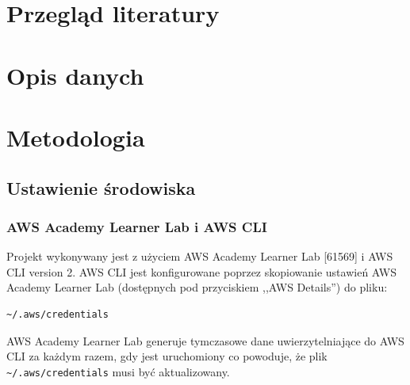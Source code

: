\documentclass[12pt, a4paper]{article}
\begin{document}







\section{Przegląd literatury}

\section{Opis danych}


\section{Metodologia}

\subsection{Ustawienie środowiska}
\subsubsection{AWS Academy Learner Lab i AWS CLI}
Projekt wykonywany jest z użyciem AWS Academy Learner Lab [61569] i AWS CLI version 2. AWS CLI jest konfigurowane poprzez skopiowanie ustawień AWS Academy Learner Lab (dostępnych pod przyciskiem ,,AWS Details'') do  pliku:
\begin{verbatim}
~/.aws/credentials
\end{verbatim}
AWS Academy Learner Lab generuje tymczasowe dane uwierzytelniające do AWS CLI za każdym razem, gdy jest uruchomiony co powoduje, że plik \verb|~/.aws/credentials| musi być aktualizowany.
\end{document}
